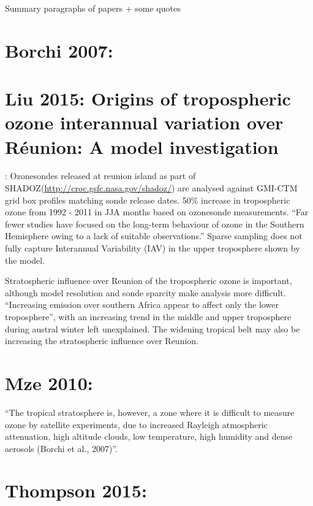 \documentclass[11pt]{article} %
\begin{document}

\begin{titlepage}
\begin{center}
Summary paragraphs of papers + some quotes

\end{center}
\end{titlepage}

\tableofcontents %
\listoffigures %
\listoftables %


\section{Borchi 2007:}


\section{Liu 2015: Origins of tropospheric ozone interannual variation over Réunion: A model investigation}
  \citet{Liu2015}:
  Ozonesondes released at reunion island as part of SHADOZ(\url{http://croc.gsfc.nasa.gov/shadoz/}) are analysed against GMI-CTM grid box profiles matching sonde release dates.
  50\% increase in tropospheric ozone from 1992 - 2011 in JJA months based on ozonesonde measurements.
  ``Far fewer studies have focused on the long-term behaviour of ozone in the Southern Hemisphere owing to a lack of suitable observations.''
  Sparse sampling does not fully capture Interannual Variability (IAV) in the upper troposphere shown by the model.
  
  Stratospheric influence over Reunion of the tropospheric ozone is important, although model resolution and sonde sparcity make analysis more difficult.
  ``Increasing emission over southern Africa appear to affect only the lower troposphere'', with an increasing trend in the middle and upper troposphere during austral winter left unexplained.
  The widening tropical belt may also be increasing the stratospheric influence over Reunion.

\section{Mze 2010:}
  \citet{Mze2010}
  ``The tropical stratosphere is, however, a zone where it is difficult to measure ozone by satellite experiments, due to increased Rayleigh atmospheric attenuation, high altitude clouds, low temperature, high humidity and dense aerosols (Borchi et al., 2007)''.

\section{Thompson 2015: }
  
\printbibliography[heading=bibintoc]
\end{document}

